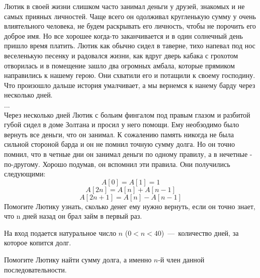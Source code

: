 
Лютик в своей жизни слишком часто занимал деньги у друзей, знакомых и не самых прияных личностей. 
Чаще всего он одолживал кругленькую сумму у очень влиятельного человека, не будем раскрывать его личность, чтобы не порочить его доброе имя. 
Но все хорошее когда-то заканчивается и в один солнечный день пришло время платить. Лютик как обычно сидел в таверне, тихо напевал под нос веселенькую песенку и радовался жизни, 
как вдруг дверь кабака с грохотом отворилась и в помещение зашло два огромных амбала, которые прямиком направились к нашему герою. Они схватили его и потащили к своему господину. 
Что произошло дальше история умалчивает, а мы вернемся к нанему барду через несколько дней.   
\\
...
\\ 
Через несколько дней Лютик с больим фингалом под правым глазом и разбитой губой сидел в доме Золтана и просил у него помощи. Ему необзодимо было вернуть все деньги, что он занимал.
К сожалению память никогда не была сильной стороной барда и он не помнил точную сумму долга. 
Но он точно помнил, что в четные дни он занимал деньги по одному правилу, а в нечетные  - по-другому. 
Хорошо подумав, он вспомнил эти правила. Они получились следующими:
\begin{equation*}
A[0]=A[1]=1
\end{equation*}
\begin{equation*}
A[2n]=A[n]+A[n-1]
\end{equation*}
\begin{equation*}
A[2n+1]=A[n]-A[n-1]
\end{equation*}
Помогите Лютику узнать, сколько денег ему нужно вернуть, если он точно знает, что n дней назад он брал займ в первый раз. 

\InputFile
На вход подается натуральное число $n$ ($0 < n < 40$)~---~количество дней, за которое копится долг.

\OutputFile
Помогите Лютику найти сумму долга, а именно $n$-й член данной последовательности.

\SAMPLES